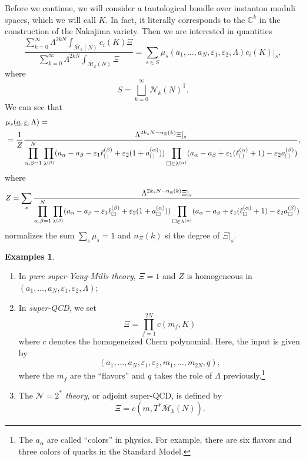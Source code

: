 \documentclass[leqno, openany]{memoir}
\theoremstyle{definition}
\newtheorem{exms}[thm]{Examples}
\theoremstyle{remark}
\theoremstyle{plain}
\theoremstyle{definition}
\theoremstyle{remark}
\newcommand{\C}{\mathbb{C}}
\newcommand{\ep}{\varepsilon}
\newcommand{\mc}[1]{\mathcal{#1}}
\newcommand{\T}{\mathbb{T}}
\newcommand{\ol}[1]{\overline{#1}}
\newcommand{\ul}[1]{\underline{#1}}
\begin{document}
Before we continue, we will consider a tautological bundle over instanton moduli spaces, which we will call $K$. In fact, it literally corresponds to the $\C^k$ in the construction of the Nakajima variety. Then we are interested in quantities
\[ \frac{\sum_{k=0}^{\infty} \Lambda^{2kN} \int_{\ol{\mc{M}}_k(N)} c_i(K) \Xi}{\sum_{k=0}^{\infty} \Lambda^{2kN} \int_{\ol{\mc{M}}_k(N)} \Xi} = \sum_{s \in S} \mu_s(a_1, \ldots, a_N, \ep_1, \ep_2, \Lambda) c_i(K)|_s, \]
where
\[ S = \bigsqcup_{k=0}^{\infty} \ol{\mc{N}}_k(N)^{\T}. \]
We can see that
\begin{align*}
    &\mu_s(\ul{a}, \ul{\ep}, \Lambda) =\\
    &=\frac{1}{Z}\frac{\Lambda^{2k_s N- n_{\Xi}(k)}\Xi|_s}{\displaystyle\prod_{\alpha,\beta=1}^N \prod_{\box \in \lambda^{(\beta)}}(a_{\alpha}-a_{\beta} - \ep_1 \ell_{\square}^{(\beta)}+ \ep_2 (1+a_{\square}^{(\alpha)})) \prod_{\square \in \lambda^{(\alpha)}} (a_{\alpha}-a_{\beta}+\ep_1 (\ell_{\square}^{(\alpha)}+1) - \ep_2 a_{\square}^{(\beta)})},
\end{align*}
where
\begin{align*}
    Z 
    =\sum_s\frac{\Lambda^{2k_s N - n_{\Xi}(k)}\Xi|_s}{\displaystyle\prod_{\alpha,\beta=1}^N \prod_{\box \in \lambda^{(\beta)}}(a_{\alpha}-a_{\beta} - \ep_1 \ell_{\square}^{(\beta)}+ \ep_2 (1+a_{\square}^{(\alpha)})) \prod_{\square \in \lambda^{(\alpha)}} (a_{\alpha}-a_{\beta}+\ep_1 (\ell_{\square}^{(\alpha)}+1) - \ep_2 a_{\square}^{(\beta)})}
\end{align*}
normalizes the sum $\sum_s \mu_s = 1$ and $n_{\Xi}(k)$ si the degree of $\Xi|_s$.

\begin{exms}\leavevmode
    \begin{enumerate}
        \item In \textit{pure super-Yang-Mills theory}, $\Xi = 1$ and $Z$ is homogeneous in $(a_1, \ldots, a_N, \ep_1, \ep_2, \Lambda)$;
        \item In \textit{super-QCD}, we set
            \[ \Xi = \prod_{f=1}^{2N} c(m_f, K) \]
            where $c$ denotes the homogeneized Chern polynomial. Here, the input is given by
            \[ (a_1, \ldots, a_N, \ep_1, \ep_2, m_1, \ldots, m_{2N}, q), \]
            where the $m_f$ are the ``flavors'' and $q$ takes the role of $\Lambda$ previously.\footnote{The $a_{\alpha}$ are called ``colors'' in physics. For example, there are six flavors and three colors of quarks in the Standard Model.}
        \item The \textit{$\mc{N}=2^*$ theory}, or adjoint super-QCD, is defined by
            \[ \Xi = c(m, T^* \ol{\mc{M}}_k(N)). \]
    \end{enumerate}
\end{exms}
\end{document}
